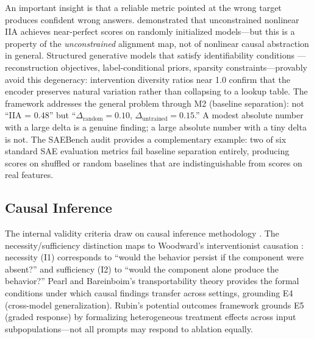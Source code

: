 \documentclass[10pt]{article}
\begin{document}
An important insight is that a reliable metric pointed at the wrong target produces confident wrong answers. \citet{sutter2025nonlinear} demonstrated that unconstrained nonlinear IIA achieves near-perfect scores on randomly initialized models---but this is a property of the \emph{unconstrained} alignment map, not of nonlinear causal abstraction in general. Structured generative models that satisfy identifiability conditions \citep{khemakhem2020variational}---reconstruction objectives, label-conditional priors, sparsity constraints---provably avoid this degeneracy: intervention diversity ratios near 1.0 confirm that the encoder preserves natural variation rather than collapsing to a lookup table. The framework addresses the general problem through M2 (baseline separation): not ``IIA = 0.48'' but ``$\Delta_{\text{random}} = 0.10$, $\Delta_{\text{untrained}} = 0.15$.'' A modest absolute number with a large delta is a genuine finding; a large absolute number with a tiny delta is not. The SAEBench audit \citep{karvonen2025saebench} provides a complementary example: two of six standard SAE evaluation metrics fail baseline separation entirely, producing scores on shuffled or random baselines that are indistinguishable from scores on real features.


\subsection{Causal Inference}
\label{sec:causal}

The internal validity criteria draw on causal inference methodology \citep{pearl2009causality, spirtes2000causation}. The necessity/sufficiency distinction maps to Woodward's interventionist causation \citep{woodward2003making}: necessity (I1) corresponds to ``would the behavior persist if the component were absent?'' and sufficiency (I2) to ``would the component alone produce the behavior?'' Pearl and Bareinboim's transportability theory \citep{pearl2011transportability} provides the formal conditions under which causal findings transfer across settings, grounding E4 (cross-model generalization). Rubin's potential outcomes framework grounds E5 (graded response) by formalizing heterogeneous treatment effects across input subpopulations---not all prompts may respond to ablation equally.
\end{document}
